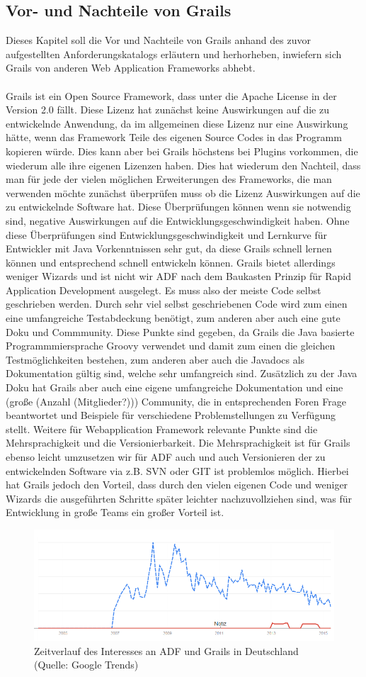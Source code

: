 \subsection{Vor- und Nachteile von Grails}
Dieses Kapitel soll die Vor und Nachteile von Grails anhand des zuvor aufgestellten Anforderungskatalogs erläutern und herhorheben, inwiefern sich Grails von anderen Web Application Frameworks abhebt.\\\\
Grails ist ein Open Source Framework, dass unter die Apache License in der Version 2.0 fällt. Diese Lizenz hat zunächst keine Auswirkungen auf die zu entwickelnde Anwendung, da im allgemeinen diese Lizenz nur eine Auswirkung hätte, wenn das Framework Teile des eigenen Source Codes in das Programm kopieren würde. Dies kann aber bei Grails höchstens bei Plugins vorkommen, die wiederum alle ihre eigenen Lizenzen haben. Dies hat wiederum den Nachteil, dass man für jede der vielen möglichen Erweiterungen des Frameworks, die man verwenden möchte zunächst überprüfen muss ob die Lizenz Auswirkungen auf die zu entwickelnde Software hat. Diese Überprüfungen können wenn sie notwendig sind, negative Auswirkungen auf die Entwicklungsgeschwindigkeit haben. Ohne diese Überprüfungen sind Entwicklungsgeschwindigkeit und Lernkurve für Entwickler mit Java Vorkenntnissen sehr gut, da diese Grails schnell lernen können und entsprechend schnell entwickeln können. Grails bietet allerdings weniger Wizards und ist nicht wir ADF nach dem Baukasten Prinzip für Rapid Application Development ausgelegt. Es muss also der meiste Code selbst geschrieben werden. Durch sehr viel selbst geschriebenen Code wird zum einen eine umfangreiche Testabdeckung benötigt, zum anderen aber auch eine gute Doku und Commmunity. Diese Punkte sind gegeben, da Grails die Java basierte Programmmiersprache Groovy verwendet und damit zum einen die gleichen Testmöglichkeiten bestehen, zum anderen aber auch die Javadocs als Dokumentation gültig sind, welche sehr umfangreich sind. Zusätzlich zu der Java Doku hat Grails aber auch eine eigene umfangreiche Dokumentation und eine (große (Anzahl (Mitglieder?))) Community, die in entsprechenden Foren Frage beantwortet und Beispiele für verschiedene Problemstellungen zu Verfügung stellt. Weitere für Webapplication Framework relevante Punkte sind die Mehrsprachigkeit und die Versionierbarkeit. Die Mehrsprachigkeit ist für Grails ebenso leicht umzusetzen wir für ADF auch und auch Versionieren der zu entwickelnden Software via z.B. SVN oder GIT ist problemlos möglich. Hierbei hat Grails jedoch den Vorteil, dass durch den vielen eigenen Code und weniger Wizards die ausgeführten Schritte später leichter nachzuvollziehen sind, was für Entwicklung in große Teams ein großer Vorteil ist.
\begin{figure}[H]
\centering
\includegraphics[width=\textwidth]{img/interesse_de.png}
\caption {Zeitverlauf des Interesses an ADF und Grails in Deutschland (Quelle: Google Trends)}
\end{figure}